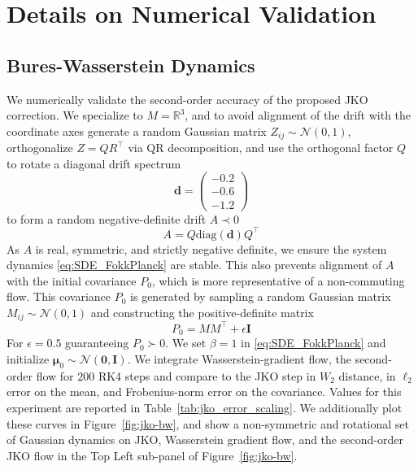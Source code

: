 \documentclass[reqno,11pt,letterpaper]{amsart}
\theoremstyle{plain}
\theoremstyle{definition}
\theoremstyle{remark}
\newcommand{\mb}{\mathbf}
\begin{document}
\section{Details on Numerical Validation}

\subsection{Bures-Wasserstein Dynamics}\label{sec:bw_numerics}

We numerically validate the second-order accuracy of the proposed JKO correction. We specialize to $M=\mathbb{R}^{3}$, and to avoid alignment of the drift with the coordinate axes generate a random Gaussian matrix $Z_{ij} \sim \mathcal{N}(0,1)$, orthogonalize $Z = Q R^{\top}$ via QR decomposition, and use the orthogonal factor $Q$ to rotate a diagonal drift spectrum
\[
\bm{d} =\begin{pmatrix}
    -0.2 \\ -0.6 \\ -1.2
\end{pmatrix}
\]
to form a random negative-definite drift $A \prec 0$
\[
A = Q \mathrm{diag}(\bm{d}) Q^{\top}
\]
As $A$ is real, symmetric, and strictly negative definite, we ensure the system dynamics \eqref{eq:SDE_FokkPlanck} are stable. This also prevents alignment of $A$ with the initial covariance $P_{0}$, which is more representative of a non-commuting flow. This covariance $P_{0}$ is generated by sampling a random Gaussian matrix $M_{ij} \sim \mathcal{N}(0,1)$ and constructing the positive-definite matrix
\[
P_{0} = MM^{\top} + \epsilon \mb{I}
\]
For $\epsilon = 0.5$ guaranteeing $P_{0} \succ 0$. We set $\beta = 1$ in \eqref{eq:SDE_FokkPlanck} and initialize $\bm{\mu}_{0} \sim \mathcal{N}(\mb{0}, \mb{I})$. We integrate Wasserstein-gradient flow, the second-order flow for $200$ RK4 steps and compare to the JKO step in $W_2$ distance, in $\ell_{2}$ error on the mean, and Frobenius-norm error on the covariance. Values for this experiment are reported in Table~\ref{tab:jko_error_scaling}. We additionally plot these curves in Figure~\ref{fig:jko-bw}, and show a non-symmetric and rotational set of Gaussian dynamics on JKO, Wasserstein gradient flow, and the second-order JKO flow in the Top Left sub-panel of Figure~\ref{fig:jko-bw}.
\end{document}
